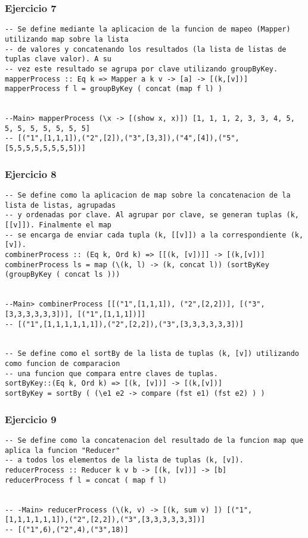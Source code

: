 \subsubsection*{Ejercicio 7}
\begin{lstlisting}
-- Se define mediante la aplicacion de la funcion de mapeo (Mapper) utilizando map sobre la lista
-- de valores y concatenando los resultados (la lista de listas de tuplas clave valor). A su
-- vez este resultado se agrupa por clave utilizando groupByKey.
mapperProcess :: Eq k => Mapper a k v -> [a] -> [(k,[v])]
mapperProcess f l = groupByKey ( concat (map f l) )


--Main> mapperProcess (\x -> [(show x, x)]) [1, 1, 1, 2, 3, 3, 4, 5, 5, 5, 5, 5, 5, 5, 5]
-- [("1",[1,1,1]),("2",[2]),("3",[3,3]),("4",[4]),("5",[5,5,5,5,5,5,5,5])]
\end{lstlisting}
\vspace{1cm}

\subsubsection*{Ejercicio 8}
\begin{lstlisting}
-- Se define como la aplicacion de map sobre la concatenacion de la lista de listas, agrupadas 
-- y ordenadas por clave. Al agrupar por clave, se generan tuplas (k, [[v]]). Finalmente el map
-- se encarga de enviar cada tupla (k, [[v]]) a la correspondiente (k, [v]).
combinerProcess :: (Eq k, Ord k) => [[(k, [v])]] -> [(k,[v])]
combinerProcess ls = map (\(k, l) -> (k, concat l)) (sortByKey (groupByKey ( concat ls ))) 


--Main> combinerProcess [[("1",[1,1,1]), ("2",[2,2])], [("3",[3,3,3,3,3,3])], [("1",[1,1,1])]]
-- [("1",[1,1,1,1,1,1]),("2",[2,2]),("3",[3,3,3,3,3,3])]


-- Se define como el sortBy de la lista de tuplas (k, [v]) utilizando como funcion de comparacion
-- una funcion que compara entre claves de tuplas.
sortByKey::(Eq k, Ord k) => [(k, [v])] -> [(k,[v])]
sortByKey = sortBy ( (\e1 e2 -> compare (fst e1) (fst e2) ) )
\end{lstlisting}
\vspace{1cm}

\subsubsection*{Ejercicio 9}
\begin{lstlisting}
-- Se define como la concatenacion del resultado de la funcion map que aplica la funcion "Reducer"
-- a todos los elementos de la lista de tuplas (k, [v]).
reducerProcess :: Reducer k v b -> [(k, [v])] -> [b]
reducerProcess f l = concat ( map f l)


-- -Main> reducerProcess (\(k, v) -> [(k, sum v) ]) [("1",[1,1,1,1,1,1]),("2",[2,2]),("3",[3,3,3,3,3,3])]
-- [("1",6),("2",4),("3",18)]
\end{lstlisting}
\vspace{1cm}

